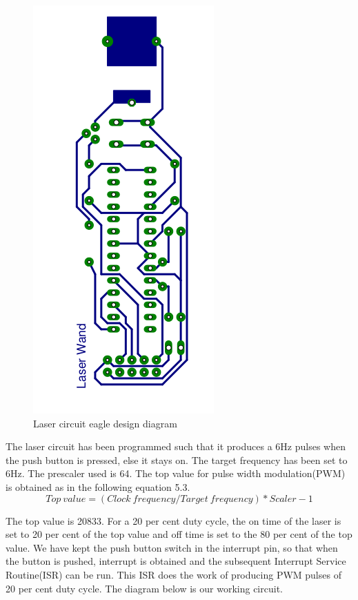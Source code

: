 \documentclass[12pt, a4paper]{article}
\begin{document}
{\begin{figure}[htp]
	\centering
	\includegraphics[scale=0.3]{eagle-non-mirror.png}
	\caption{Laser circuit eagle design diagram}
	\label{}
\end{figure}

	The laser circuit has been programmed such that it produces a 6Hz pulses when the push button is pressed, else it stays on. The target frequency has been set to 6Hz. The prescaler used is 64. The top value for pulse width modulation(PWM) is obtained as in the following equation 5.3. 
	\begin{equation}
	Top\ value = (Clock\  frequency/Target\  frequency)*Scaler - 1
	\end{equation}
	
	The top value is 20833. For a 20 per cent duty cycle, the on time of the laser is set to 20 per cent of the top value and off time is set to the 80 per cent of the top value. We have kept the push button switch in the interrupt pin, so that when the button is pushed, interrupt is obtained and the subsequent Interrupt Service Routine(ISR) can be run. This ISR does the work of producing PWM pulses of 20 per cent duty cycle. The diagram below is our working circuit.

}
\end{document}
